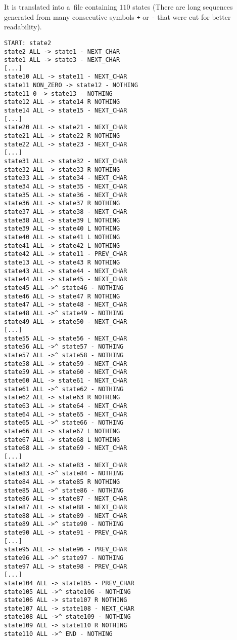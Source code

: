 \documentclass[english,shortabstract,mgr]{iithesis}
\begin{document}
It is translated into a~file containing $110$ states (There are long
sequences generated from many consecutive symbols \texttt{+} or \texttt{-} that
were cut for better readability).
\setlength{\columnsep}{1.5cm}
\begin{multicols}{2}
\begin{verbatim}
START: state2
state2 ALL -> state1 - NEXT_CHAR
state1 ALL -> state3 - NEXT_CHAR
[...]
state10 ALL -> state11 - NEXT_CHAR
state11 NON_ZERO -> state12 - NOTHING
state11 0 -> state13 - NOTHING
state12 ALL -> state14 R NOTHING
state14 ALL -> state15 - NEXT_CHAR
[...]
state20 ALL -> state21 - NEXT_CHAR
state21 ALL -> state22 R NOTHING
state22 ALL -> state23 - NEXT_CHAR
[...]
state31 ALL -> state32 - NEXT_CHAR
state32 ALL -> state33 R NOTHING
state33 ALL -> state34 - NEXT_CHAR
state34 ALL -> state35 - NEXT_CHAR
state35 ALL -> state36 - NEXT_CHAR
state36 ALL -> state37 R NOTHING
state37 ALL -> state38 - NEXT_CHAR
state38 ALL -> state39 L NOTHING
state39 ALL -> state40 L NOTHING
state40 ALL -> state41 L NOTHING
state41 ALL -> state42 L NOTHING
state42 ALL -> state11 - PREV_CHAR
state13 ALL -> state43 R NOTHING
state43 ALL -> state44 - NEXT_CHAR
state44 ALL -> state45 - NEXT_CHAR
state45 ALL ->^ state46 - NOTHING
state46 ALL -> state47 R NOTHING
state47 ALL -> state48 - NEXT_CHAR
state48 ALL ->^ state49 - NOTHING
state49 ALL -> state50 - NEXT_CHAR
[...]
state55 ALL -> state56 - NEXT_CHAR
state56 ALL ->^ state57 - NOTHING
state57 ALL ->^ state58 - NOTHING
state58 ALL -> state59 - NEXT_CHAR
state59 ALL -> state60 - NEXT_CHAR
state60 ALL -> state61 - NEXT_CHAR
state61 ALL ->^ state62 - NOTHING
state62 ALL -> state63 R NOTHING
state63 ALL -> state64 - NEXT_CHAR
state64 ALL -> state65 - NEXT_CHAR
state65 ALL ->^ state66 - NOTHING
state66 ALL -> state67 L NOTHING
state67 ALL -> state68 L NOTHING
state68 ALL -> state69 - NEXT_CHAR
[...]
state82 ALL -> state83 - NEXT_CHAR
state83 ALL ->^ state84 - NOTHING
state84 ALL -> state85 R NOTHING
state85 ALL ->^ state86 - NOTHING
state86 ALL -> state87 - NEXT_CHAR
state87 ALL -> state88 - NEXT_CHAR
state88 ALL -> state89 - NEXT_CHAR
state89 ALL ->^ state90 - NOTHING
state90 ALL -> state91 - PREV_CHAR
[...]
state95 ALL -> state96 - PREV_CHAR
state96 ALL ->^ state97 - NOTHING
state97 ALL -> state98 - PREV_CHAR
[...]
state104 ALL -> state105 - PREV_CHAR
state105 ALL ->^ state106 - NOTHING
state106 ALL -> state107 R NOTHING
state107 ALL -> state108 - NEXT_CHAR
state108 ALL ->^ state109 - NOTHING
state109 ALL -> state110 R NOTHING
state110 ALL ->^ END - NOTHING
\end{verbatim}
\end{multicols}
\end{document}
